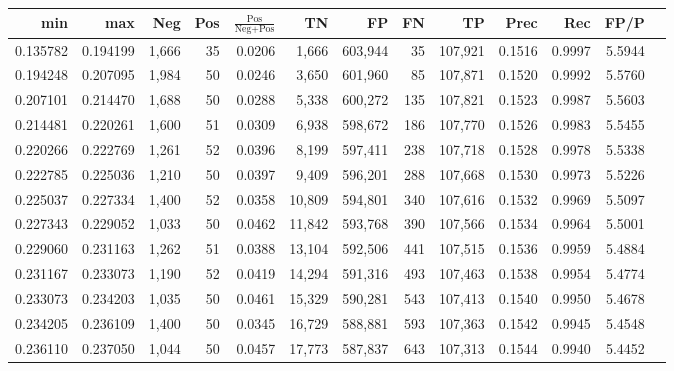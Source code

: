 \begin{tabular}{rrrrrrrrrrrrr}
\toprule
     min &      max &   Neg & Pos & $\frac{\text{Pos}}{\text{Neg}+\text{Pos}}$ &      TN &      FP &      FN &      TP &   Prec &    Rec &   FP/P \\
\midrule
0.135782 & 0.194199 & 1,666 &  35 &                                     0.0206 &   1,666 & 603,944 &      35 & 107,921 & 0.1516 & 0.9997 & 5.5944 \\
0.194248 & 0.207095 & 1,984 &  50 &                                     0.0246 &   3,650 & 601,960 &      85 & 107,871 & 0.1520 & 0.9992 & 5.5760 \\
0.207101 & 0.214470 & 1,688 &  50 &                                     0.0288 &   5,338 & 600,272 &     135 & 107,821 & 0.1523 & 0.9987 & 5.5603 \\
0.214481 & 0.220261 & 1,600 &  51 &                                     0.0309 &   6,938 & 598,672 &     186 & 107,770 & 0.1526 & 0.9983 & 5.5455 \\
0.220266 & 0.222769 & 1,261 &  52 &                                     0.0396 &   8,199 & 597,411 &     238 & 107,718 & 0.1528 & 0.9978 & 5.5338 \\
0.222785 & 0.225036 & 1,210 &  50 &                                     0.0397 &   9,409 & 596,201 &     288 & 107,668 & 0.1530 & 0.9973 & 5.5226 \\
0.225037 & 0.227334 & 1,400 &  52 &                                     0.0358 &  10,809 & 594,801 &     340 & 107,616 & 0.1532 & 0.9969 & 5.5097 \\
0.227343 & 0.229052 & 1,033 &  50 &                                     0.0462 &  11,842 & 593,768 &     390 & 107,566 & 0.1534 & 0.9964 & 5.5001 \\
0.229060 & 0.231163 & 1,262 &  51 &                                     0.0388 &  13,104 & 592,506 &     441 & 107,515 & 0.1536 & 0.9959 & 5.4884 \\
0.231167 & 0.233073 & 1,190 &  52 &                                     0.0419 &  14,294 & 591,316 &     493 & 107,463 & 0.1538 & 0.9954 & 5.4774 \\
0.233073 & 0.234203 & 1,035 &  50 &                                     0.0461 &  15,329 & 590,281 &     543 & 107,413 & 0.1540 & 0.9950 & 5.4678 \\
0.234205 & 0.236109 & 1,400 &  50 &                                     0.0345 &  16,729 & 588,881 &     593 & 107,363 & 0.1542 & 0.9945 & 5.4548 \\
0.236110 & 0.237050 & 1,044 &  50 &                                     0.0457 &  17,773 & 587,837 &     643 & 107,313 & 0.1544 & 0.9940 & 5.4452 \\

\end{tabular}
